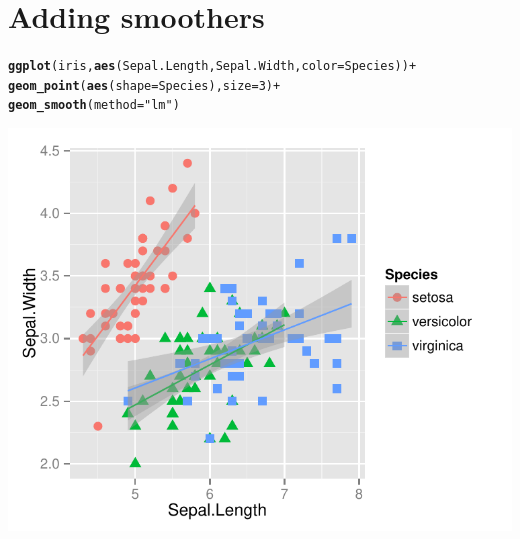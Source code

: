 \documentclass{beamer}\usepackage[]{graphicx}\usepackage[]{color}
\makeatletter
\newcommand{\hlnum}[1]{\textcolor[rgb]{0.686,0.059,0.569}{#1}}%
\newcommand{\hlstr}[1]{\textcolor[rgb]{0.192,0.494,0.8}{#1}}%
\newcommand{\hlopt}[1]{\textcolor[rgb]{0,0,0}{#1}}%
\newcommand{\hlstd}[1]{\textcolor[rgb]{0.345,0.345,0.345}{#1}}%
\newcommand{\hlkwc}[1]{\textcolor[rgb]{0.333,0.667,0.333}{#1}}%
\newcommand{\hlkwd}[1]{\textcolor[rgb]{0.737,0.353,0.396}{\textbf{#1}}}%
\newenvironment{kframe}{%
 \def\at@end@of@kframe{}%
 \ifinner\ifhmode%
  \def\at@end@of@kframe{\end{minipage}}%
  \begin{minipage}{\columnwidth}%
 \fi\fi%
 \def\FrameCommand##1{\hskip\@totalleftmargin \hskip-\fboxsep
 \colorbox{shadecolor}{##1}\hskip-\fboxsep
     \hskip-\linewidth \hskip-\@totalleftmargin \hskip\columnwidth}%
 \MakeFramed {\advance\hsize-\width
   \@totalleftmargin\z@ \linewidth\hsize
   \@setminipage}}%
 {\par\unskip\endMakeFramed%
 \at@end@of@kframe}
\newenvironment{knitrout}{}{} %
\makeatother
\begin{document}

\section*{Adding smoothers}
\frame{\sectionpage}


\begin{frame}[fragile]
\begin{knitrout}\footnotesize
{}\color{fgcolor}\begin{kframe}
\begin{alltt}
\hlkwd{ggplot}\hlstd{(iris,} \hlkwd{aes}\hlstd{(Sepal.Length, Sepal.Width,} \hlkwc{color} \hlstd{= Species))} \hlopt{+}
    \hlkwd{geom_point}\hlstd{(}\hlkwd{aes}\hlstd{(}\hlkwc{shape} \hlstd{= Species),} \hlkwc{size} \hlstd{=} \hlnum{3}\hlstd{)} \hlopt{+}
    \hlkwd{geom_smooth}\hlstd{(}\hlkwc{method} \hlstd{=} \hlstr{"lm"}\hlstd{)}
\end{alltt}
\end{kframe}

{\centering \includegraphics[width=.75\linewidth]{figure/adding_stats_} 

}



\end{knitrout}
\end{frame}

\end{document}
